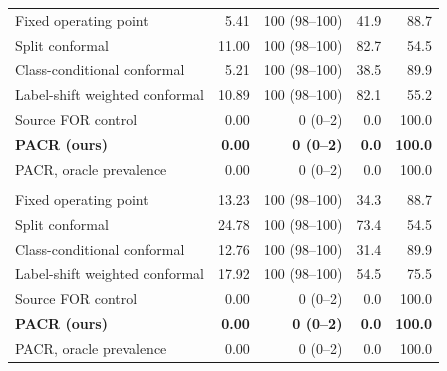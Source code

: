 \begin{table}[!htbp]
\begin{tabular}{@{}lrrrr@{}}
\quad Fixed operating point & 5.41 & 100 (98--100) & 41.9 & 88.7 \\
\quad Split conformal & 11.00 & 100 (98--100) & 82.7 & 54.5 \\
\quad Class-conditional conformal & 5.21 & 100 (98--100) & 38.5 & 89.9 \\
\quad Label-shift weighted conformal & 10.89 & 100 (98--100) & 82.1 & 55.2 \\
\quad Source FOR control & 0.00 & 0 (0--2) & 0.0 & 100.0 \\
\quad \textbf{PACR (ours)} & \textbf{0.00} & \textbf{0 (0--2)} & \textbf{0.0} & \textbf{100.0} \\
\quad PACR, oracle prevalence & 0.00 & 0 (0--2) & 0.0 & 100.0 \\
\addlinespace
\multicolumn{5}{@{}l}{\textit{Deployment prevalence 40\%}} \\
\quad Fixed operating point & 13.23 & 100 (98--100) & 34.3 & 88.7 \\
\quad Split conformal & 24.78 & 100 (98--100) & 73.4 & 54.5 \\
\quad Class-conditional conformal & 12.76 & 100 (98--100) & 31.4 & 89.9 \\
\quad Label-shift weighted conformal & 17.92 & 100 (98--100) & 54.5 & 75.5 \\
\quad Source FOR control & 0.00 & 0 (0--2) & 0.0 & 100.0 \\
\quad \textbf{PACR (ours)} & \textbf{0.00} & \textbf{0 (0--2)} & \textbf{0.0} & \textbf{100.0} \\
\quad PACR, oracle prevalence & 0.00 & 0 (0--2) & 0.0 & 100.0 \\
\bottomrule
\end{tabular}
\end{table}
